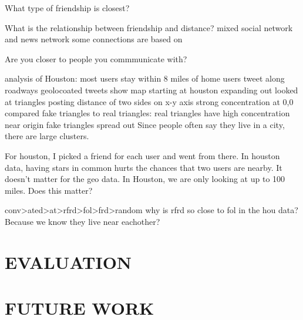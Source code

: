 \documentclass{sig-alternate}
\begin{document}
What type of friendship is closest?

What is the relationship between friendship and distance?
mixed social network and news network
some connections are based on 

Are you closer to people you commmunicate with?















analysis of Houston:
most users stay within 8 miles of home
users tweet along roadways
geolocoated tweets show map starting at houston expanding out
looked at triangles posting distance of two sides on x-y axis
strong concentration at 0,0
compared fake triangles to real triangles:
    real triangles have high concentration near origin
    fake triangles spread out
Since people often say they live in a city, there are large clusters.

For houston, I picked a friend for each user and went from there.
In houston data, having stars in common hurts the chances that two users are nearby.  It doesn't matter for the geo data. In Houston, we are only looking at up to 100 miles. Does this matter?


conv>ated>at>rfrd>fol>frd>random
why is rfrd so close to fol in the hou data? Because we know they live near eachother?








\section{EVALUATION}
\section{FUTURE WORK}


 
\end{document}
